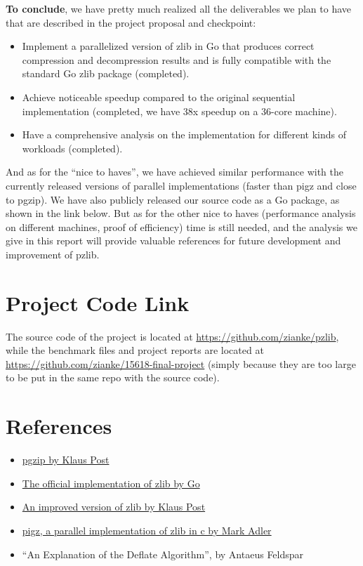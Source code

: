 \documentclass[12pt]{article}
\begin{document}
    \textbf{To conclude}, we have pretty much realized all the deliverables we plan to have that are described in the project proposal and checkpoint:
    \begin{itemize}
        \item Implement a parallelized version of zlib in Go that produces correct compression and decompression results and is fully compatible with the standard Go zlib package (completed).
        \item Achieve noticeable speedup compared to the original sequential implementation (completed, we have 38x speedup on a 36-core machine).
        \item Have a comprehensive analysis on the implementation for different kinds of workloads (completed).
    \end{itemize}
    And as for the ``nice to haves'', we have achieved similar performance with the currently released versions of parallel implementations (faster than pigz and close to pgzip). We have also publicly released our source code as a Go package, as shown in the link below. But as for the other nice to haves (performance analysis on different machines, proof of efficiency) time is still needed, and the analysis we give in this report will provide valuable references for future development and improvement of pzlib.
\section{Project Code Link}
    The source code of the project is located at \href{https://github.com/zianke/pzlib}{https://github.com/zianke/pzlib}, while the benchmark files and project reports are located at \href{https://github.com/zianke/15618-final-project}{https://github.com/zianke/15618-final-project} (simply because they are too large to be put in the same repo with the source code).
\section{References}
\begin{itemize}
\item \href{https://github.com/klauspost/pgzip/blob/master/gzip.go}{pgzip by Klaus Post}
\item \href{https://github.com/golang/go/tree/master/src/compress/zlib}{The official implementation of zlib by Go}
\item \href{https://github.com/klauspost/compress/tree/master/zlib}{An improved version of zlib by Klaus Post}
\item \href{https://zlib.net/pigz/}{pigz, a parallel implementation of zlib in c by Mark Adler}
\item ``An Explanation of the Deflate Algorithm'', by Antaeus Feldspar
\end{itemize}
\end{document}
